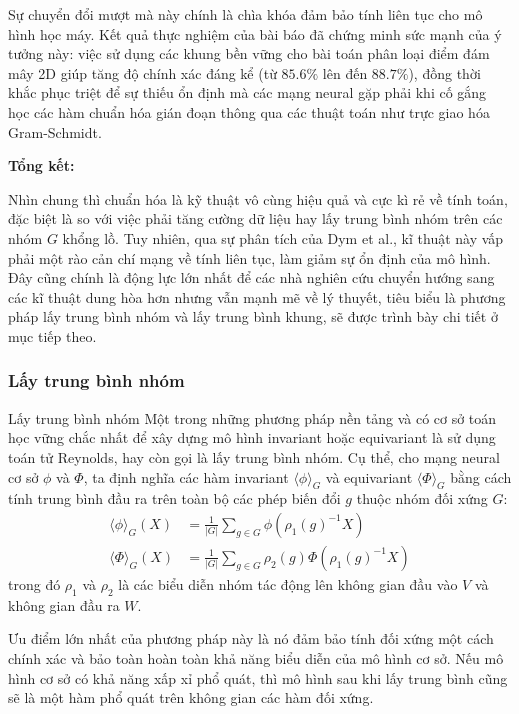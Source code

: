 Sự chuyển đổi mượt mà này chính là chìa khóa đảm bảo tính liên tục cho mô hình học máy. Kết quả thực nghiệm của bài báo đã chứng minh sức mạnh của ý tưởng này: việc sử dụng các khung bền vững cho bài toán phân loại điểm đám mây 2D giúp tăng độ chính xác đáng kể (từ $85.6\%$ lên đến $88.7\%$), đồng thời khắc phục triệt để sự thiếu ổn định mà các mạng neural gặp phải khi cố gắng học các hàm chuẩn hóa gián đoạn thông qua các thuật toán như trực giao hóa Gram-Schmidt.

\textbf{Tổng kết:}

Nhìn chung thì chuẩn hóa là kỹ thuật vô cùng hiệu quả và cực kì rẻ về tính toán, đặc biệt là so với việc phải tăng cường dữ liệu hay lấy trung bình nhóm trên các nhóm $G$ khổng lồ. Tuy nhiên, qua sự phân tích của Dym et al., kĩ thuật này vấp phải một rào cản chí mạng về tính liên tục, làm giảm sự ổn định của mô hình. Đây cũng chính là động lực lớn nhất để các nhà nghiên cứu chuyển hướng sang các kĩ thuật dung hòa hơn nhưng vẫn mạnh mẽ về lý thuyết, tiêu biểu là phương pháp lấy trung bình nhóm và lấy trung bình khung, sẽ được trình bày chi tiết ở mục tiếp theo.


\subsubsection{Lấy trung bình nhóm}
\label{subsubsec:group-averaging}

\begin{infobox}{Lấy trung bình nhóm}
Một trong những phương pháp nền tảng và có cơ sở toán học vững chắc nhất để xây dựng mô hình invariant hoặc equivariant là sử dụng toán tử Reynolds, hay còn gọi là lấy trung bình nhóm. Cụ thể, cho mạng neural cơ sở $\phi$ và $\Phi$, ta định nghĩa các hàm invariant $\langle \phi \rangle_G$ và equivariant $\langle \Phi \rangle_G$ bằng cách tính trung bình đầu ra trên toàn bộ các phép biến đổi $g$ thuộc nhóm đối xứng $G$:
\begin{align}
    \langle \phi \rangle_G(X) &= \frac{1}{|G|} \sum_{g \in G} \phi(\rho_1(g)^{-1}X) \label{eq:group-avg-inv} \\
    \langle \Phi \rangle_G(X) &= \frac{1}{|G|} \sum_{g \in G} \rho_2(g)\Phi(\rho_1(g)^{-1}X) \label{eq:group-avg-eqv}
\end{align}
trong đó $\rho_1$ và $\rho_2$ là các biểu diễn nhóm tác động lên không gian đầu vào $V$ và không gian đầu ra $W$.
\end{infobox}

Ưu điểm lớn nhất của phương pháp này là nó đảm bảo tính đối xứng một cách chính xác và bảo toàn hoàn toàn khả năng biểu diễn của mô hình cơ sở. Nếu mô hình cơ sở có khả năng xấp xỉ phổ quát, thì mô hình sau khi lấy trung bình cũng sẽ là một hàm phổ quát trên không gian các hàm đối xứng.

